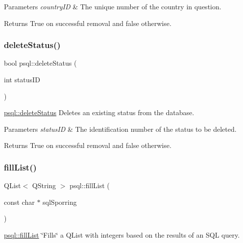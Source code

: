 \begin{DoxyParams}{Parameters}
{\em country\+ID} & The unique number of the country in question. \\
\hline
\end{DoxyParams}
\begin{DoxyReturn}{Returns}
True on successful removal and false otherwise. 
\end{DoxyReturn}
\mbox{\label{classpsql_a26fc592cfb9f484e1bee62af527f2b95}} 
\subsubsection{\texorpdfstring{delete\+Status()}{deleteStatus()}}
{\footnotesize\ttfamily bool psql\+::delete\+Status (\begin{DoxyParamCaption}\item[{int}]{status\+ID }\end{DoxyParamCaption})}



\mbox{\hyperlink{classpsql_a26fc592cfb9f484e1bee62af527f2b95}{psql\+::delete\+Status}} Deletes an existing status from the database. 


\begin{DoxyParams}{Parameters}
{\em status\+ID} & The identification number of the status to be deleted. \\
\hline
\end{DoxyParams}
\begin{DoxyReturn}{Returns}
True on successful removal and false otherwise. 
\end{DoxyReturn}
\mbox{\label{classpsql_a2ad41caea89dc5af0b55b12f6394fbf5}} 
\subsubsection{\texorpdfstring{fill\+List()}{fillList()}}
{\footnotesize\ttfamily Q\+List$<$ Q\+String $>$ psql\+::fill\+List (\begin{DoxyParamCaption}\item[{const char $\ast$}]{sql\+Sporring }\end{DoxyParamCaption})}



\mbox{\hyperlink{classpsql_a2ad41caea89dc5af0b55b12f6394fbf5}{psql\+::fill\+List}} \char`\"{}\+Fills\char`\"{} a Q\+List with integers based on the results of an S\+QL query. 


